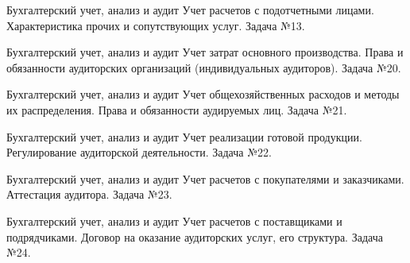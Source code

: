 \documentclass[
	11pt,
	a4paper,
	]
	{article}
\begin{document}
\begin{minipage}[t][\miniH]{\miniL}\centering
	 {Бухгалтерский учет, анализ и аудит}
		{
			Учет расчетов с подотчетными лицами.
		}{
			Характеристика прочих и сопутствующих услуг.
		}{
			Задача №13.
		}
	\lowGE
\end{minipage}

\vfill



\begin{minipage}[t][\miniH]{\miniL}\centering
	 {Бухгалтерский учет, анализ и аудит}
		{
			Учет затрат основного производства.
		}{
			Права и обязанности аудиторских организаций (индивидуальных аудиторов).
		}{
			Задача №20.
		}
	\lowGE
\end{minipage}

\vfill



\begin{minipage}[t][\miniH]{\miniL}\centering
	 {Бухгалтерский учет, анализ и аудит}
		{
			Учет общехозяйственных расходов и методы их распределения.
		}{
			Права и обязанности аудируемых лиц.
		}{
			Задача №21.
		}
	\lowGE
\end{minipage}





\begin{minipage}[t][\miniH]{\miniL}\centering
	 {Бухгалтерский учет, анализ и аудит}
		{
			Учет реализации готовой продукции.
		}{
			Регулирование аудиторской деятельности.
		}{
			Задача №22.
		}
	\lowGE
\end{minipage}

\vfill



\begin{minipage}[t][\miniH]{\miniL}\centering
	 {Бухгалтерский учет, анализ и аудит}
		{
			Учет расчетов с покупателями и заказчиками.
		}{
			Аттестация аудитора.
		}{
			Задача №23.
		}
	\lowGE
\end{minipage}

\vfill



\begin{minipage}[t][\miniH]{\miniL}\centering
	 {Бухгалтерский учет, анализ и аудит}
		{
			Учет расчетов с поставщиками и подрядчиками.
		}{
			Договор на оказание аудиторских услуг, его структура.
		}{
			Задача №24.
		}
	\lowGE
\end{minipage}
\end{document}
